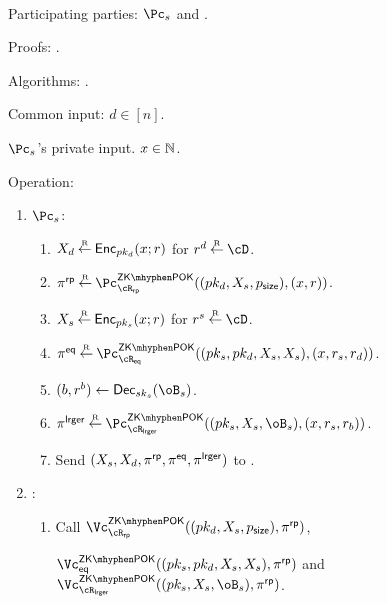 \begin{protocol}~\label{prot:ConfidentialTransactions:Transfer}
	\item[Participating parties:] $\Pc_s$ and \Cc.
	
\item[Proofs:]   \piZKPOK{\rRP}. 


\item[Algorithms:]    \Dec.

	
	\item[Common input:] $d\in [n]$.
	
	\item[$\Pc_s$'s private  input.] $x \in {\mathbb{N}}$.
	
\item[Operation:] ~
	
	\begin{enumerate}
		\item  $\Pc_s$: 
		
		\begin{enumerate}
			\item $X_d \mathbin{\stackrel{\mbox{\tiny R}}{\leftarrow}} \mathsf{Enc}_{pk_d}(x;r)$ for $r^d \getsr \cD$.
			
		
			\item $\pi^\RPs \getsr \pZKPOK{\rRP}((pk_d,X_s,\psize),(x,r))$.
			
			
			\item $X_s \mathbin{\stackrel{\mbox{\tiny R}}{\leftarrow}} \mathsf{Enc}_{pk_s}(x;r)$ for $r^s \getsr \cD$.
			
			
			
			\item $\pi^\Eqs \getsr \pZKPOK{\rEQ}((pk_s,pk_d,X_s,X_s),(x,r_s,r_d))$.
			
			
			\item $(b,r^b) \asn \Dec_{sk_s}(\oB_s)$.
			
			
			\item $\pi^\Lrgs \getsr \pZKPOK{\rLrg}((pk_s,X_s,\oB_s),(x,r_s,r_b))$.
			
			
			\item Send $(X_s,X_d,\pi^{\sf rp},\pi^{\sf eq},\pi^{\sf lrger})$ to \Cc.
		\end{enumerate}
		
		
		\item  \Cc: 
		
		\begin{enumerate}
			\item  Call $\vZKPOK{\rRP}((pk_d,X_s,\psize),\pi^\RPs)$,
			
			 $\vZKPOK{\Eqs}((pk_s,pk_d,X_s,X_s),\pi^\RPs)$ and $\vZKPOK{\rLrg}((pk_s,X_s,\oB_s),\pi^\RPs)$.
			

\end{enumerate}
\end{enumerate}
\end{protocol}
